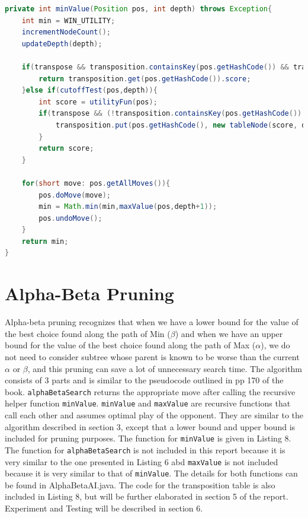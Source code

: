 \documentclass[9.5pt]{extarticle}
\begin{document}
\begin{lstlisting}[language=java,caption={Java code for minValue for minimax algorithm}]
private int minValue(Position pos, int depth) throws Exception{
	int min = WIN_UTILITY;
	incrementNodeCount();
	updateDepth(depth);

	if(transpose && transposition.containsKey(pos.getHashCode()) && transposition.get(pos.getHashCode()).depth > CURR_DEPTH){
		return transposition.get(pos.getHashCode()).score;
	}else if(cutoffTest(pos,depth)){
		int score = utilityFun(pos);
		if(transpose && (!transposition.containsKey(pos.getHashCode()) || transposition.get(pos.getHashCode()).depth < depth)) {
			transposition.put(pos.getHashCode(), new tableNode(score, depth));
		}
		return score;
	}

	for(short move: pos.getAllMoves()){
		pos.doMove(move);
		min = Math.min(min,maxValue(pos,depth+1));
		pos.undoMove();
	}
	return min;
}
\end{lstlisting}

\section{Alpha-Beta Pruning}

Alpha-beta pruning recognizes that when we have a lower bound for the value of the best choice found along the path of Min ($\beta$)  and when we have an upper bound for the value of the best choice found along the path of Max ($\alpha$), we do not need to consider subtree whose parent is known to be worse than the current $\alpha$ or $\beta$, and this pruning can save a lot of unnecessary search time. The algorithm consists of 3 parts and is similar to the pseudocode outlined in pp 170 of the book. \verb`alphaBetaSearch` returns the appropriate move after calling the recursive helper function \verb`minValue`. \verb`minValue` and \verb`maxValue` are recursive functions that call each other and assumes optimal play of the opponent. They are similar to the algorithm described in section 3, except that a lower bound and upper bound is included for pruning purposes. The function for \verb`minValue` is given in Listing 8. The function for \verb`alphaBetaSearch` is not included in this report because it is very similar to the one presented in Listing 6 abd \verb`maxValue` is not included because it is very similar to that of \verb`minValue`. The details for both functions can be found in AlphaBetaAI.java.  The code for the transposition table is also included in Listing 8, but will be further elaborated in section 5 of the report. Experiment and Testing will be described in section 6.
\end{document}
